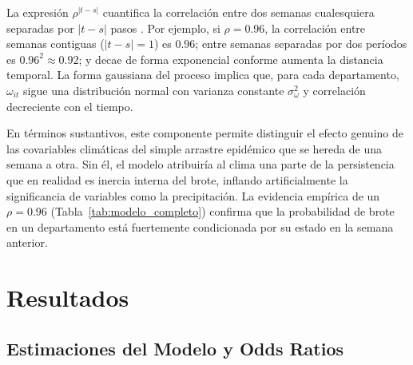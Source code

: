 \documentclass[11pt,a4paper]{article}
\begin{document}
\begin{itemize}
	La expresión $\rho^{|t-s|}$ cuantifica la correlación entre dos semanas cualesquiera separadas por $|t - s|$ pasos \parencite{box2015time}. Por ejemplo, si $\rho = 0.96$, la correlación entre semanas contiguas ($|t-s|=1$) es $0.96$; entre semanas separadas por dos períodos es $0.96^2 \approx 0.92$; y decae de forma exponencial conforme aumenta la distancia temporal. La forma gaussiana del proceso implica que, para cada departamento, $\omega_{it}$ sigue una distribución normal con varianza constante $\sigma_\omega^2$ y correlación decreciente con el tiempo.

	En términos sustantivos, este componente permite distinguir el efecto genuino de las covariables climáticas del simple arrastre epidémico que se hereda de una semana a otra. Sin él, el modelo atribuiría al clima una parte de la persistencia que en realidad es inercia interna del brote, inflando artificialmente la significancia de variables como la precipitación. La evidencia empírica de un $\rho = 0.96$ (Tabla~\ref{tab:modelo_completo}) confirma que la probabilidad de brote en un departamento está fuertemente condicionada por su estado en la semana anterior.
\end{itemize}

\section{Resultados}

\subsection{Estimaciones del Modelo y Odds Ratios}
\end{document}
